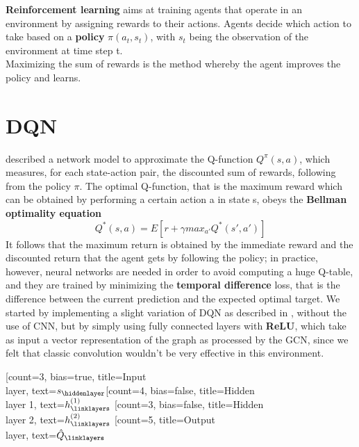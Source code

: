 \textbf{Reinforcement learning} aims at training agents that operate in an environment by assigning rewards to their actions. Agents decide which action to take based on a \textbf{policy} $\pi(a_t, s_t)$, with $s_t$ being the observation of the environment at time step t. \\
Maximizing the sum of rewards is the method whereby the agent improves the policy and learns.

\section{DQN}
\cite{dqn} described a network model to approximate the Q-function $Q^{\pi}(s,a)$, which measures, for each state-action pair, the discounted sum of rewards, following from the policy $\pi$. The optimal Q-function, that is the maximum reward which can be obtained by performing a certain action a in state s, obeys the \textbf{Bellman optimality equation} $$Q^*(s,a) = E[r + \gamma max_{a'}Q^*(s', a')]$$
It follows that the maximum return is obtained by the immediate reward and the discounted return that the agent gets by following the policy; in practice, however, neural networks are needed in order to avoid computing a huge Q-table, and they are trained by minimizing the \textbf{temporal difference} loss, that is the difference between the current prediction and the expected optimal target.  
We started by implementing a slight variation of DQN as described in \cite{dqn}, without the use of CNN, but by simply using fully connected layers with \textbf{ReLU}, which take as input a vector representation of the graph as processed by the GCN, since we felt that classic convolution wouldn't be very effective in this environment. \\
\begin{center}
\begin{neuralnetwork} [nodespacing=10mm, layerspacing=25mm,
			maintitleheight=2.5em, layertitleheight=2.5em,
			height=5, toprow=false, nodesize=17pt, style={},
			title={}, titlestyle={}]
		        \newcommand{\x}[2]{$s_#2$}
		        \newcommand{\y}[2]{$\hat{Q}_#2$}
		        \newcommand{\hfirst}[2]{\small $h^{(1)}_#2$}
		        \newcommand{\hsecond}[2]{\small $h^{(2)}_#2$}
		        [count=3, bias=true, title=Input\\layer, text=\x]
		        \hiddenlayer[count=4, bias=false, title=Hidden\\layer 1, text=\hfirst] \linklayers
		        \hiddenlayer[count=3, bias=false, title=Hidden\\layer 2, text=\hsecond] \linklayers
		        \outputlayer[count=5, title=Output\\layer, text=\y] \linklayers
\end{neuralnetwork}
\end{center}
	
